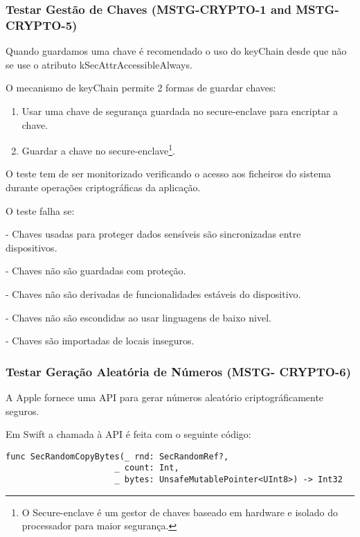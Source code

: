 \subsubsection{Testar Gestão de Chaves (MSTG-CRYPTO-1 and MSTG-CRYPTO-5)}
\hfill\par
\hfill\par
Quando guardamos uma chave é recomendado o uso do keyChain desde que não se use o atributo kSecAttrAccessibleAlways.

O mecanismo de keyChain permite 2 formas de guardar chaves:
\begin{enumerate}
	\item Usar uma chave de segurança guardada no secure-enclave para encriptar a chave.

	\item Guardar a chave no secure-enclave\footnote[4]{ O Secure-enclave é um gestor de chaves baseado em hardware e isolado do processador para maior segurança\cite{book}.}.
\end{enumerate}



O teste tem de ser monitorizado verificando o acesso aos ficheiros do sistema durante operações criptográficas da aplicação.

O teste falha se:

	- Chaves usadas para proteger dados sensíveis são sincronizadas entre dispositivos.

	- Chaves não são guardadas com proteção.

	- Chaves não são derivadas de funcionalidades estáveis do dispositivo.

	- Chaves não são escondidas ao usar linguagens de baixo nivel.

	- Chaves são importadas de locais inseguros.




\subsubsection{Testar Geração Aleatória de Números (MSTG- CRYPTO-6)}
\hfill\par
\hfill\par

A Apple fornece uma API para gerar números aleatório criptográficamente seguros.

Em Swift a chamada à API é feita com o seguinte código:

\begin{lstlisting}[basicstyle=\small,]
    func SecRandomCopyBytes(_ rnd: SecRandomRef?,
                      _ count: Int,
                      _ bytes: UnsafeMutablePointer<UInt8>) -> Int32
\end{lstlisting}

